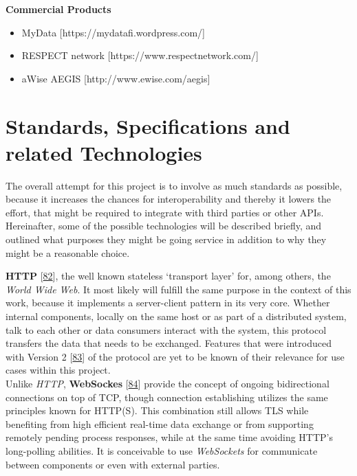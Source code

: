 \documentclass[12pt,english,a4paper,titlepage,cleardoublepage=empty,dottedtoc]{report}
\providecommand{\tightlist}{%
  \setlength{\itemsep}{0pt}\setlength{\parskip}{0pt}}
\begin{document}
\textbf{Commercial Products}

\begin{itemize}
\tightlist
\item
  MyData {[}https://mydatafi.wordpress.com/{]}
\item
  RESPECT network {[}https://www.respectnetwork.com/{]}
\item
  aWise AEGIS {[}http://www.ewise.com/aegis{]}
\end{itemize}

\hypertarget{standards-specifications-and-related-technologies}{\section{Standards,
Specifications and related
Technologies}\label{standards-specifications-and-related-technologies}}

The overall attempt for this project is to involve as much standards as
possible, because it increases the chances for interoperability and
thereby it lowers the effort, that might be required to integrate with
third parties or other APIs. Hereinafter, some of the possible
technologies will be described briefly, and outlined what purposes they
might be going service in addition to why they might be a reasonable
choice.

\textbf{\protect\hypertarget{def--http}{}{HTTP}}
{[}\protect\hyperlink{ref-web_spec_http1}{82}{]}, the well known
stateless `transport layer' for, among others, the \emph{World Wide
Web}. It most likely will fulfill the same purpose in the context of
this work, because it implements a server-client pattern in its very
core. Whether internal components, locally on the same host or as part
of a distributed system, talk to each other or data consumers interact
with the system, this protocol transfers the data that needs to be
exchanged. Features that were introduced with Version 2
{[}\protect\hyperlink{ref-web_spec_http2}{83}{]} of the protocol are yet
to be known of their relevance for use cases within this project.\\
Unlike \emph{HTTP}, \textbf{WebSockes}
{[}\protect\hyperlink{ref-web_spec_websockets}{84}{]} provide the
concept of ongoing bidirectional connections on top of TCP, though
connection establishing utilizes the same principles known for HTTP(S).
This combination still allows TLS while benefiting from high efficient
real-time data exchange or from supporting remotely pending process
responses, while at the same time avoiding HTTP's long-polling
abilities. It is conceivable to use \emph{WebSockets} for communicate
between components or even with external parties.
\end{document}
